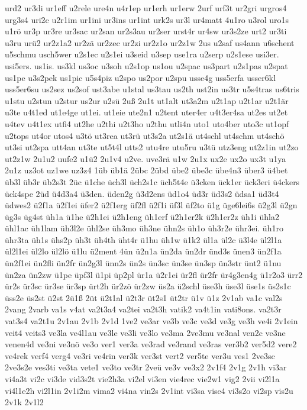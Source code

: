{urd2
ur3di
ur1eff
u2rele
ure4n
u4r1ep
ur1erh
ur1erw
2urf
urf3t
ur2gri
urgros4
urg3s4
uri2c
u2r1im
ur1ini
ur3ins
ur1int
urk2s
ur3l
ur4matt
4u1ro
u3rol
uro1s
u1rö
ur3p
ur3re
ur3sac
ur2san
ur2s3au
ur2ser
urst4r
ur4sw
ur3s2ze
urt2
ur3ti
u3ru
urü2
ur2z1a2
ur2zä
ur2zec
ur2zi
ur2z1o
ur2z1w
2us
u2saf
us4ann
u6schent
u5schmu
usch5wer
u2s1ec
u2s1ei
u3seid
u3sep
use1ra
u2serp
u2s1ese
usi3er.
usi5ers.
us1is.
us3kl
us3oc
u3soh
u2s1op
us1ou
u2spac
us3part
u2s1pas
u2spat
us1pe
u3s2pek
us1pic
u5s4piz
u2spo
us2por
u2spu
usse4g
uss5erfa
usser6kl
uss5er6su
us2sez
us2sof
ust3abe
u1stal
us3tau
us2th
ust2in
us3tr
u5s4tras
us6tris
u1stu
u2stun
u2stur
us2ur
u2sü
2uß
2u1t
ut1alt
ut3a2m
u2t1ap
u2t1ar
u2t1är
u3te
u4t1ed
ut1e4ge
ut1ei.
ut1eie
ute2n1
u2tent
uter4er
u4t3er4sa
ut2es
ut2et
u4tev
u4t1ex
utfi4
ut2he
u2thi
u2t3ho
u2thu
utli4n
uto1
uto4ber
uto3c
ut1opf
u2tops
ut4or
utos4
u3tö
ut3rea
ut3rü
ut3s2a
ut2s1ä
ut4schl
ut4schm
ut4schö
ut3si
ut2spa
utt4an
ut3te
ut5t4l
utts2
utu4re
utu5ru
u3tü
utz3eng
ut2z1in
ut2zo
ut2z1w
2u1u2
uufe2
u1ü2
2u1v4
u2ve.
uve3rä
u1w
2u1x
ux2e
ux2o
ux3t
u1ya
2u1z
uz3ot
uz1we
uz3z4
1üb
üb1ä
2übc
2übd
übe2
übe3c
übe4n3
über3
ü4bet
üb3l
üb3r
üb2s3t
2üc
ü1che
üch3l
üch2s1c
üch5t4e
ü3cken
ück1er
ück3eri
ü4ckers
ück4spe
2üd
ü4d3a4
ü3den.
üden2g
ü3d2ens
üd1o4
üd3r
üd3s2
üdsa1
üd3t4
üdwes2
ü2f1a
ü2f1ei
üfer2
ü2f1erg
üf2fl
ü2f1i
üf3l
üf2to
ü1g
üge6lei6s
ü2g3l
ü2gn
üg3s
üg4st
üh1a
ü1he
ü2h1ei
ü2h1eng
üh1erf
ü2h1er2k
ü2h1er2z
üh1i
ühla2
ühl1ac
üh1lam
üh3l2e
ühl2se
üh3mo
üh3ne
ühn2s
üh1o
üh3r2e
ühr3ei.
üh1ro
ühr3ta
üh1s
ühs2p
üh3t
üh4th
üht4r
ü1hu
üh1w
ü1k2
ül1a
ül2c
ü3l4e
ül2l1a
ül2l1ei
ül2lo
ül2lö
ü1lu
ü2ment
4ün
ü2n1a
ün2da
ün2dr
ünd3s
ünen3
ün2f1a
ün2f1ei
ün2fli
ün2fr
ün2g3l
ünn2s
ün2s
ün3sc
ün3se
ün3sp
ün3str
ünt2
ü1nu
ün2za
ün2zw
ü1pe
üpf3l
ü1pi
üp2pl
ür1a
ü2r1ei
ür2fl
ür2fr
ür4g3en4g
ü1r2o3
ürr2
ür2s
ür3sc
ür3se
ür3sp
ürt2h
ür2zö
ür2zw
üs2a
ü2schl
üse3h
üse3l
üse1s
üs2s1c
üss2e
üs2st
ü2st
2ü1ß
2üt
ü2t1al
ü2t3r
üt2s1
üt2tr
ü1v
ü1z
2v1ab
va1c
val2s
2vang
2varb
va1s
v4at
va2t3a4
va2tei
va2t3h
vatik2
va4t1in
vati8ons.
va2t3r
vat3s4
va2t1u
2v1au
2v1b
2v1d
1ve2
ve3ar
ve3b
ve3c
ve3d
ve3g
ve3h
ve4i
2v1ein
veit4
veits3
ve3la
ve4l1au
ve3le
ve3li
ve3lo
ve3ma
2ve3mu
ve3nal
ven2c
ve3ne
venen4d
ve3ni
ve3nö
ve3o
ver1
ver3a
ve3rad
ve3rand
ve3ras
ver3b2
ver5d2
vere2
ve4rek
verf4
verg4
ve3ri
ve4rin
ver3k
ver3st
vert2
ver5te
ver3u
ves1
2ve3sc
2ve3s2e
ves3ti
ve3ta
vete1
ve3to
ve3tr
2veü
ve3v
ve3x2
2v1f4
2v1g
2v1h
vi3ar
vi4a3t
vi2c
vi3de
vid3s2t
vie2h3a
vi2el
vi3en
vie4rec
vie2w1
vig2
2vii
vi2l1a
vi4l1e2h
vi2l1in
2v1i2m
vima2
vi4na
vin2s
2v1int
vi3sa
vise4
vi3s2o
vi2sp
vis2u
2v1k
2v1l2
}
